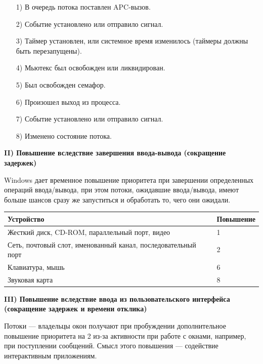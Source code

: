 \documentclass[14pt, a4paper]{extarticle}
\begin{document}
	\begin{itemize}
		\item[1)] В очередь потока поставлен APC-вызов.
		\item[2)] Событие установлено или отправило сигнал.
		\item[3)] Таймер установлен, или системное время изменилось (таймеры должны быть
		перезапущены).
		\item[4)] Мьютекс был освобожден или ликвидирован.
		\item[5)] Был освобожден семафор.
		\item[6)] Произошел выход из процесса.
		\item[7)] Событие установлено или отправило сигнал.
		\item[8)] Изменено состояние потока.		
	\end{itemize}

	
	\textbf{II) Повышение вследствие завершения ввода-вывода (сокращение задержек)}\par
	Windows дает временное повышение приоритета при завершении определенных
	операций ввода/вывода, при этом потоки, ожидавшие ввода/вывода, имеют больше
	шансов сразу же запуститься и обработать то, чего они ожидали.
	
	\begin{table}[h]
		\begin{center}
			\begin{tabular}{|l|l|}
				\hline
				\textbf{Устройство} & \textbf{Повышение} \\ \hline
				Жесткий диск, CD-ROM, параллельный порт, видео & 1 \\ \hline
				Сеть, почтовый слот, именованный канал, последовательный порт & 2 \\ \hline
				Клавиатура, мышь & 6 \\ \hline
				Звуковая карта & 8 \\ \hline
			\end{tabular}
		\end{center}
	\end{table}
	
	\newpage
	
	\textbf{III) Повышение вследствие ввода из пользовательского интерфейса (сокращение
	задержек и времени отклика)}\par
	
	Потоки — владельцы окон получают при пробуждении дополнительное повышение
	приоритета на 2 из-за активности при работе с окнами, например, при поступлении
	сообщений. Смысл этого повышения — содействие интерактивным приложениям.
	
\end{document}
